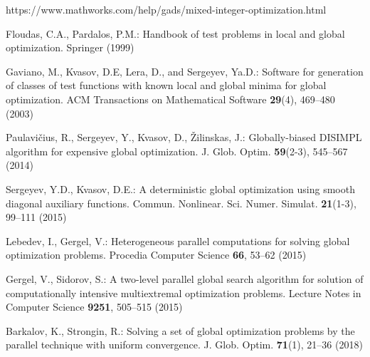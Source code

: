 \documentclass{llncs}
\begin{document}
\begin{thebibliography}{10}
https://www.mathworks.com/help/gads/mixed-integer-optimization.html

Floudas, C.A., Pardalos, P.M.:  Handbook of test problems in local and global optimization. 
Springer (1999)  %

 Gaviano, M., Kvasov, D.E, Lera, D., and Sergeyev, Ya.D.: Software for 
generation of classes of test functions with known local and global minima for global 
optimization. ACM Transactions on Mathematical Software \textbf{29}(4), 469--480 (2003)

Paulavi\v{c}ius, R., Sergeyev, Y., Kvasov, D., \v{Z}ilinskas, J.: Globally-biased DISIMPL 
algorithm for expensive global optimization. J. Glob. Optim. \textbf{59}(2-3), 545--567 (2014)

Sergeyev, Y.D., Kvasov, D.E.: A deterministic global optimization using smooth diagonal 
auxiliary functions. Commun. Nonlinear. Sci. Numer. Simulat. \textbf{21}(1-3), 99--111 (2015)

Lebedev, I., Gergel, V.: Heterogeneous parallel computations for solving global optimization 
problems. Procedia Computer Science \textbf{66}, 53--62 (2015)

Gergel, V., Sidorov, S.: A two-level parallel global search algorithm for solution of 
computationally intensive multiextremal optimization problems. Lecture Notes in Computer 
Science  \textbf{9251}, 505--515 (2015)

Barkalov, K., Strongin, R.: Solving a set of global optimization problems by the parallel technique with uniform convergence. J. Glob. Optim. \textbf{71}(1), 21--36 (2018)


\end{thebibliography}
\end{document}
